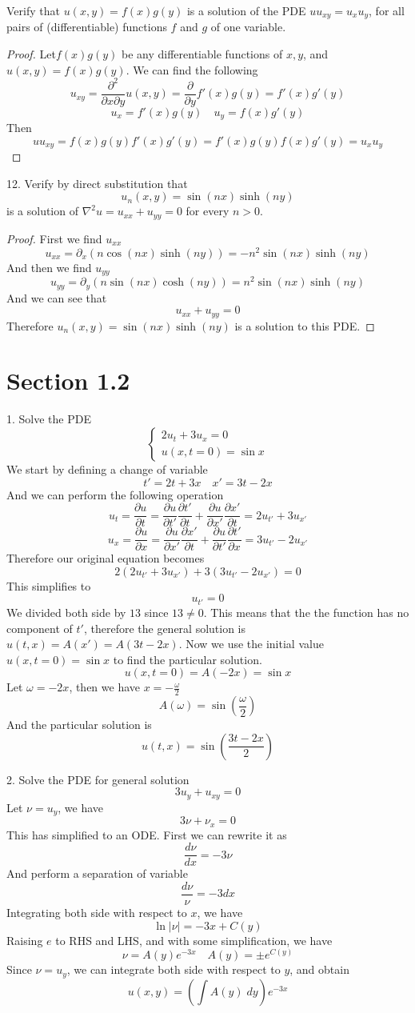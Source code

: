 \documentclass[12pt]{article}
\newcommand{\pypx}[2]{\frac{\partial #1}{\partial #2}}
\newcommand{\dydx}[2]{\frac{d #1}{d #2}}
\newcommand{\paren}[1]{\left( #1 \right)}
\newcommand{\abso}[1]{\left|#1 \right|}
\begin{document}
\newpage
{} Verify that \( u(x, y) = f(x) g(y) \) is a solution of the PDE \( uu_{xy} = u_x u_y \), for all pairs of (differentiable) functions \( f \) and \( g \) of one variable.
    \begin{proof}
        Let$f(x) g(y)$ be any differentiable functions of $x,y$, and $u(x,y) = f(x)g(y)$. We can find the following
        \[
        u_{xy} = \pypx{^2}{x\partial y}u(x,y) = \pypx{}{y}f'(x)g(y) = f'(x)g'(y) 
        \]
        \[
        u_x = f'(x)g(y) \quad u_y = f(x)g'(y)
        \]
        Then
        \[
        uu_{xy} = f(x) g(y)f'(x)g'(y)  =f'(x)g(y)f(x)g'(y) =  u_xu_y 
        \]
    \end{proof}

12. Verify by direct substitution that
\[
u_n(x,y) =\sin(nx)\sinh(ny)
\]
is a solution of $\nabla^2 u = u_{xx} + u_{yy} = 0$ for every $n>0$.
\begin{proof}
    First we find $u_{xx}$
    \[
    u_{xx} = \partial_x \paren{n\cos(nx)\sinh(ny)} = -n^2\sin(nx)\sinh(ny)
    \]
    And then we find $u_{yy}$
    \[
    u_{yy} = \partial_y\paren{n\sin(nx)\cosh(ny)} = n^2\sin(nx)\sinh(ny)
    \]
    And we can see that
    \[
    u_{xx} + u_{yy} = 0
    \]
    Therefore $u_n(x,y) =\sin(nx)\sinh(ny)$ is a solution to this PDE. 
\end{proof}

\section{Section 1.2}
1. Solve the PDE
\[
\begin{cases}
    2u_t + 3u_x = 0\\
    u(x,t=0) = \sin x
\end{cases}
\]
We start by defining a change of variable
\[
t' = 2t + 3x \quad x' = 3t-2x
\]
And we can perform the following operation
\[
u_t = \pypx{u}{t} = \pypx{u}{t'}\pypx{t'}{t} + \pypx{u}{x'}\pypx{x'}{t} = 2u_{t'} + 3u_{x'}
\]
\[
u_x = \pypx{u}{x} = \pypx{u}{x'}\pypx{x'}{t} + \pypx{u}{t'}\pypx{t'}{x} = 3u_{t'} - 2u_{x'}
\]
Therefore our original equation becomes
\[
2\paren{2u_{t'} + 3u_{x'}} + 3\paren{3u_{t'} - 2u_{x'}} = 0
\]
This simplifies to
\[
u_{t'} = 0
\]
We divided both side by $13$ since $13 \neq 0$. This means that the the function has no component of $t'$, therefore the general solution is $u(t,x) = A(x') = A(3t-2x)$. Now we use the initial value $u(x,t=0) = \sin x$ to find the particular solution.
\[
u(x,t=0) = A(-2x) = \sin x
\]
Let $\omega = -2x$, then we have $x = -\frac{\omega}{2}$
\[
A(\omega) = \sin \paren{\frac{\omega}{2}}
\]
And the particular solution is
\[
u(t,x) = \sin\paren{\frac{3t-2x}{2}}
\]


2. Solve the PDE for general solution
\[
3u_y + u_{xy} = 0
\]
Let $\nu = u_y$, we have
\[
3\nu + \nu_x = 0
\]
This has simplified to an ODE. First we can rewrite it as
\[
\dydx{\nu}{x} = -3 \nu
\]
And perform a separation of variable
\[
\frac{d\nu}{\nu} = -3dx
\]
Integrating both side with respect to $x$, we have
\[
\ln\abso{\nu} = -3x+C(y)
\]
Raising $e$ to RHS and LHS, and with some simplification, we have
\[
\nu = A(y)e^{-3x} \quad A(y) = \pm e^{C(y)}
\]
Since $\nu = u_y$, we can integrate both side with respect to $y$, and obtain
\[
u(x,y) = \paren{\int A(y)\;dy}e^{-3x}
\]
\end{document}
